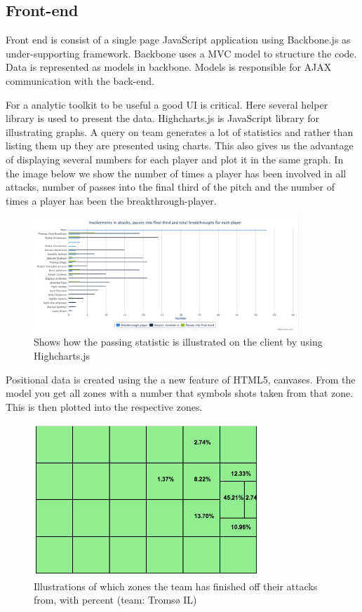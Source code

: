 \subsection{Front-end}

Front end is consist of a single page JavaScript application using Backbone.js as under-supporting framework. Backbone uses a MVC model to structure the code. Data is represented as models in backbone. Models is responsible for AJAX communication with the back-end. 

For a analytic toolkit to be useful a good UI is critical. Here several helper library is used to present the data. Highcharts.js is JavaScript library for illustrating graphs. A query on team generates a lot of statistics and rather than listing them up they are presented using charts. This also gives us the advantage of displaying several numbers for each player and plot it in the same graph. In the image below we show the number of times a player has been involved in all attacks, number of passes into the final third of the pitch and the number of times a player has been the breakthrough-player.

\begin{figure}[ht!]
\centering
\includegraphics[width=100mm]{images/general/chart_passes.png}
\caption{Shows how the passing statistic is illustrated on the client by using Highcharts.js}
\label{overflow}
\end{figure}

Positional data is created using the a new feature of HTML5, canvases. From the model you get all zones with a number that symbols shots taken from that zone. This is then plotted into the respective zones. 

\begin{figure}[ht!]
\centering
\includegraphics[width=85mm]{images/general/finishing_zones.png}
\caption{Illustrations of which zones the team has finished off their attacks from, with percent (team: Tromsø IL)}
\label{overflow}
\end{figure}

